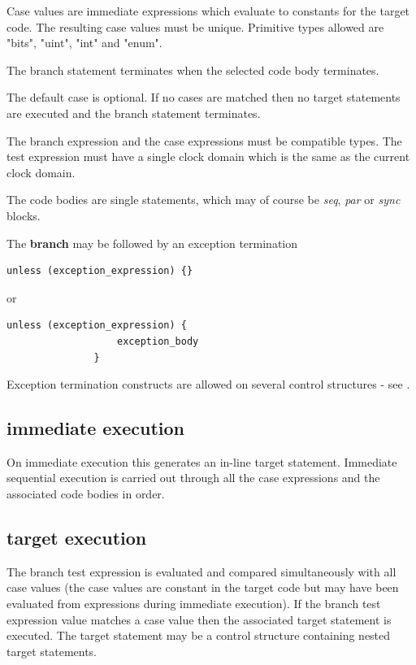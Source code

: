         Case values are immediate expressions which evaluate to constants for
        the target code. The resulting case values must be unique. Primitive
        types allowed are "bits", "uint", "int" and "enum".

        The branch statement terminates when the selected code body terminates.

        The default case is optional. If no cases are matched then no target
        statements are executed and the branch statement terminates.

        The branch expression and the case expressions must be compatible types.
        The test expression must have a single clock domain which is the same as
        the current clock domain.

        The code bodies are single statements, which may of course be {\em seq},
        {\em par} or {\em sync} blocks.
        
        The {\bf branch} may be followed by an exception termination
        \begin{lstlisting}[gobble=8, language=threepl]
               unless (exception_expression) {}
        \end{lstlisting}
        or
        \begin{lstlisting}[gobble=8, language=threepl]
               unless (exception_expression) {
                   exception_body
               }
        \end{lstlisting}
        
        Exception termination constructs are allowed on several control structures
        - see .
        
        \subsection{immediate execution}
        
            On immediate execution this generates an in-line target statement.
            Immediate sequential execution is carried out through all the case
            expressions and the associated code bodies in order.
        
        \subsection{target execution}

            The branch test expression is evaluated and compared simultaneously
            with all case values (the case values are constant in the target
            code but may have been evaluated from expressions during immediate
            execution). If the branch test expression value matches a case value
            then the associated target statement is executed. The target
            statement may be a control structure containing nested target
            statements.

